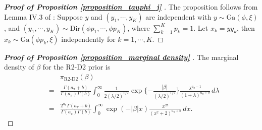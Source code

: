 \documentclass[12pt]{article}
\begin{document}
\begin{proof} [\textbf{Proof of Proposition \ref{proposition_tauphi_j} }]
	The proposition follows from {Lemma IV.3 of \cite{zhou2015negative}}:
	Suppose $y$ and $(y_1,\cdots,y_K)$ are independent with $y\sim\text{Ga}(\phi, \xi)$,
	and $(y_1,\cdots,y_K)\sim\text{Dir}(\phi p_1,\cdots,\phi p_K)$, where $\sum_{k=1}^Kp_k=1$. Let $x_k=yy_k$, then  $x_k\sim\text{Ga}(\phi p_k, \xi)$ independently for $ k=1,\cdots, K $.
\end{proof}




\begin{proof} [\textbf{Proof of Proposition \ref{proposition_marginal density}} ]
	The marginal density of $\beta$ for the  R2-D2  prior is
	\begin{eqnarray} \label{eq_marginal_DH}
	&& \pi_{\text{R2-D2}}(\beta)   \nonumber  \\
	& = & \frac{ \Gamma(a_\pi+b)}{\Gamma(a_\pi) \Gamma(b)}  \int_{0}^\infty \frac{1}{2 (\lambda/2)^{1/2}}\exp\{-\frac{|\beta|}{(\lambda/2)^{1/2}}\} \frac{\lambda^{a_\pi-1}}{(1+\lambda)^{a_\pi+b}} \,d\lambda  \nonumber  \label{eq_R2D2marginal density 1st} \\
	&= & \frac{2^{a_\pi}\Gamma(a_\pi+b)}{\Gamma(a_\pi)\Gamma(b)}   \int_{ 0}^\infty   \exp (- |\beta|x )\frac{x^{ 2b}}{(x^2+2)^{a_\pi+b}}  \, dx  \label{eq_mariginal density_integral} .

\end{eqnarray}
\end{proof}
\end{document}
